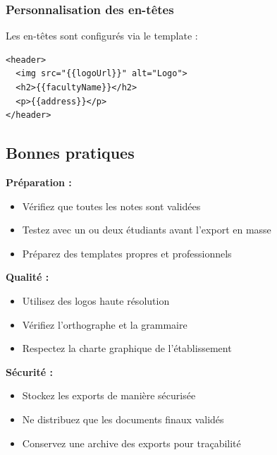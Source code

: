\subsubsection{Personnalisation des en-têtes}

Les en-têtes sont configurés via le template :
\begin{lstlisting}[language={}, frame=single, basicstyle=\small\ttfamily]
<header>
  <img src="{{logoUrl}}" alt="Logo">
  <h2>{{facultyName}}</h2>
  <p>{{address}}</p>
</header>
\end{lstlisting}

\subsection{Bonnes pratiques}

\begin{tcolorbox}[colback=green!5!white,colframe=green!75!black,title=Recommandations pour les exports]

\textbf{Préparation :}
\begin{itemize}[leftmargin=*]
    \item Vérifiez que toutes les notes sont validées
    \item Testez avec un ou deux étudiants avant l'export en masse
    \item Préparez des templates propres et professionnels
\end{itemize}

\textbf{Qualité :}
\begin{itemize}[leftmargin=*]
    \item Utilisez des logos haute résolution
    \item Vérifiez l'orthographe et la grammaire
    \item Respectez la charte graphique de l'établissement
\end{itemize}

\textbf{Sécurité :}
\begin{itemize}[leftmargin=*]
    \item Stockez les exports de manière sécurisée
    \item Ne distribuez que les documents finaux validés
    \item Conservez une archive des exports pour traçabilité
\end{itemize}
\end{tcolorbox}

\newpage
